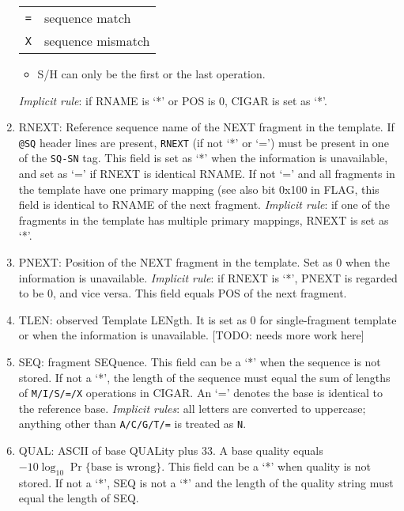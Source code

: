 \documentclass[10pt]{article}
\begin{document}
\begin{enumerate}
\begin{center}
\begin{tabular}{cl}
  {\tt =} & sequence match \\
  {\tt X} & sequence mismatch \\
  \hline
  \end{tabular}
  \end{center}
  \begin{itemize}
  \item S/H can only be the first or the last operation.
  \end{itemize}
  \emph{Implicit rule}: if {\sf RNAME} is `*' or {\sf POS} is 0, {\sf
    CIGAR} is set as `*'.
\item {\sf RNEXT}: Reference sequence name of the NEXT fragment in the
  template. If {\tt @SQ} header lines are present, {\tt RNEXT} (if not
  `*' or `=') must be present in one of the {\tt SQ-SN} tag. This field
  is set as `*' when the information is unavailable, and set as `=' if
  {\sf RNEXT} is identical {\sf RNAME}. If not `=' and all fragments in
  the template have one primary mapping (see also bit 0x100 in {\sf
    FLAG}, this field is identical to {\sf RNAME} of the next
  fragment. \emph{Implicit rule}: if one of the fragments in the
  template has multiple primary mappings, {\sf RNEXT} is set as `*'.
\item {\sf PNEXT}: Position of the NEXT fragment in the template. Set as
  0 when the information is unavailable. \emph{Implicit rule}: if {\sf
    RNEXT} is `*', {\sf PNEXT} is regarded to be 0, and vice versa. This
  field equals {\sf POS} of the next fragment.
\item {\sf TLEN}: observed Template LENgth. It is set as 0 for
  single-fragment template or when the information is
  unavailable. [TODO: needs more work here]
\item {\sf SEQ}: fragment SEQuence. This field can be a `*' when the
  sequence is not stored. If not a `*', the length of the sequence must
  equal the sum of lengths of {\tt M/I/S/=/X} operations in {\sf CIGAR}.
  An `=' denotes the base is identical to the reference base.
  \emph{Implicit rules}: all letters are converted to uppercase;
  anything other than {\tt A/C/G/T/=} is treated as {\tt N}.
\item {\sf QUAL}: ASCII of base QUALity plus 33. A base quality equals
  $-10\log_{10}\Pr\{\mbox{base is wrong}\}$. This field can be a `*'
  when quality is not stored. If not a `*', {\sf SEQ} is not a `*' and
  the length of the quality string must equal the length of {\sf SEQ}.
\end{enumerate}
\end{document}
